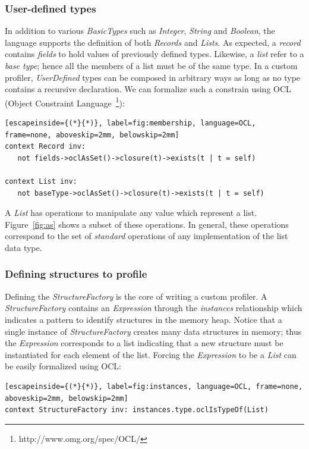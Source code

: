 \subsubsection{User-defined types}
In addition to various \textit{BasicTypes} such as \textit{Integer}, \textit{String} and \textit{Boolean}, the language supports the definition of both \textit{Records} and \textit{Lists}.
As expected, a \textit{record} contains \textit{fields} to hold values of previously defined types.
Likewise, a \textit{list} refer to a \textit{base type}; hence all the members of a list must be of the same type.
In a custom profiler, \textit{UserDefined} types can be composed in arbitrary ways as long as no type contains a recursive declaration.
We can formalize such a constrain using OCL (Object Constraint Language~\footnote{http://www.omg.org/spec/OCL/}):

\begin{lstlisting}[escapeinside={(*}{*)}, label=fig:membership, language=OCL, frame=none, aboveskip=2mm, belowskip=2mm]
context Record inv: 
   not fields->oclAsSet()->closure(t)->exists(t | t = self)

context List inv:
   not baseType->oclAsSet()->closure(t)->exists(t | t = self)
\end{lstlisting} 

A \textit{List} has operations to manipulate any value which represent a list.
Figure~\ref{fig:as} shows a subset of these operations.
In general, these operations correspond to the set of \textit{standard} operations of any implementation of the list data type.

\subsubsection{Defining structures to profile}
Defining the \textit{StructureFactory} is the core of writing a custom profiler.
A \textit{StructureFactory} contains an \textit{Expression} through the \textit{instances} relationship which indicates a pattern to identify structures in the memory heap.
Notice that a single instance of \textit{StructureFactory} creates many data structures in memory; thus the \textit{Expression} corresponds to a list indicating that a new structure must be instantiated for each element of the list.
Forcing the \textit{Expression} to be a \textit{List} can be easily formalized using OCL:

\begin{lstlisting}[escapeinside={(*}{*)}, label=fig:instances, language=OCL, frame=none, aboveskip=2mm, belowskip=2mm]
context StructureFactory inv: instances.type.oclIsTypeOf(List)
\end{lstlisting}

